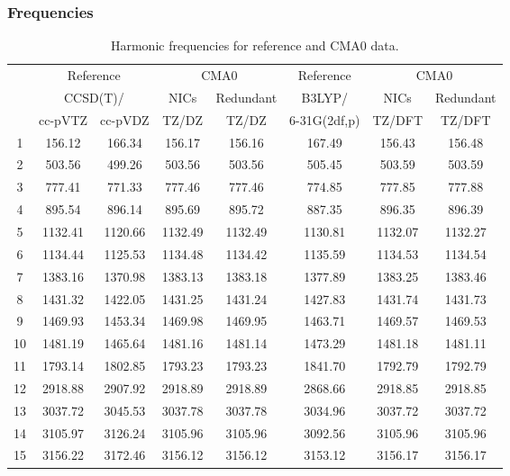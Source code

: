 \documentclass[10pt,oneside]{article}
\begin{document}
\begin{table}[h!]
\subsubsection*{Frequencies}
\centering
\caption{Harmonic frequencies for reference and CMA0 data.}
\begin{tabular}{cccccccc}
\toprule
{} & \multicolumn{2}{c}{Reference} & \multicolumn{2}{c}{CMA0} &    Reference & \multicolumn{2}{c}{CMA0} \\
{} & \multicolumn{2}{c}{CCSD(T)/} &    NICs &  Redundant &       B3LYP/ &    NICs & Redundant \\
{} &   cc-pVTZ & cc-pVDZ &   TZ/DZ &      TZ/DZ & 6-31G(2df,p) &  TZ/DFT &    TZ/DFT \\
\midrule
1  &    156.12 &  166.34 &  156.17 &     156.16 &       167.49 &  156.43 &    156.48 \\
2  &    503.56 &  499.26 &  503.56 &     503.56 &       505.45 &  503.59 &    503.59 \\
3  &    777.41 &  771.33 &  777.46 &     777.46 &       774.85 &  777.85 &    777.88 \\
4  &    895.54 &  896.14 &  895.69 &     895.72 &       887.35 &  896.35 &    896.39 \\
5  &   1132.41 & 1120.66 & 1132.49 &    1132.49 &      1130.81 & 1132.07 &   1132.27 \\
6  &   1134.44 & 1125.53 & 1134.48 &    1134.42 &      1135.59 & 1134.53 &   1134.54 \\
7  &   1383.16 & 1370.98 & 1383.13 &    1383.18 &      1377.89 & 1383.25 &   1383.46 \\
8  &   1431.32 & 1422.05 & 1431.25 &    1431.24 &      1427.83 & 1431.74 &   1431.73 \\
9  &   1469.93 & 1453.34 & 1469.98 &    1469.95 &      1463.71 & 1469.57 &   1469.53 \\
10 &   1481.19 & 1465.64 & 1481.16 &    1481.14 &      1473.29 & 1481.18 &   1481.11 \\
11 &   1793.14 & 1802.85 & 1793.23 &    1793.23 &      1841.70 & 1792.79 &   1792.79 \\
12 &   2918.88 & 2907.92 & 2918.89 &    2918.89 &      2868.66 & 2918.85 &   2918.85 \\
13 &   3037.72 & 3045.53 & 3037.78 &    3037.78 &      3034.96 & 3037.72 &   3037.72 \\
14 &   3105.97 & 3126.24 & 3105.96 &    3105.96 &      3092.56 & 3105.96 &   3105.96 \\
15 &   3156.22 & 3172.46 & 3156.12 &    3156.12 &      3153.12 & 3156.17 &   3156.17 \\
\bottomrule
\end{tabular}
\end{table}
\end{document}
